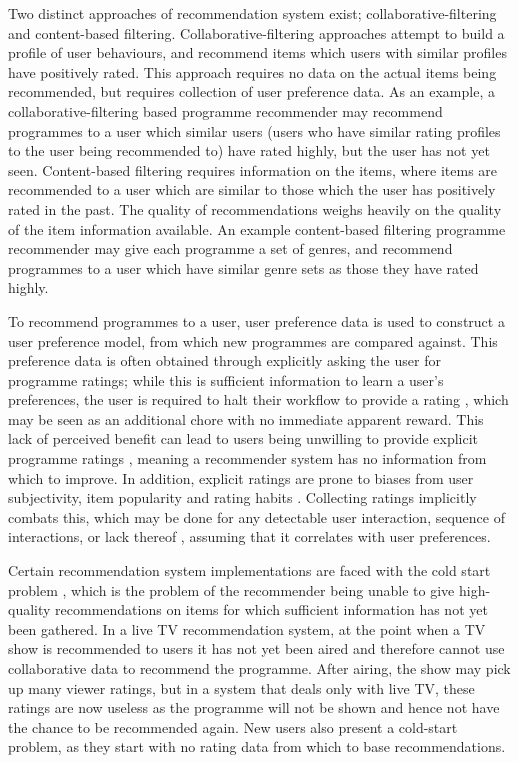 	Two distinct approaches of recommendation system exist; collaborative-filtering and content-based filtering. Collaborative-filtering approaches attempt to build a profile of user behaviours, and recommend items which users with similar profiles have positively rated. This approach requires no data on the actual items being recommended, but requires collection of user preference data. As an example, a collaborative-filtering based programme recommender may recommend programmes to a user which similar users (users who have similar rating profiles to the user being recommended to) have rated highly, but the user has not yet seen. Content-based filtering requires information on the items, where items are recommended to a user which are similar to those which the user has positively rated in the past. The quality of recommendations weighs heavily on the quality of the item information available. An example content-based filtering programme recommender may give each programme a set of genres, and recommend programmes to a user which have similar genre sets as those they have rated highly.

	To recommend programmes to a user, user preference data is used to construct a user preference model, from which new programmes are compared against. This preference data is often obtained through explicitly asking the user for programme ratings; while this is sufficient information to learn a user's preferences, the user is required to halt their workflow to provide a rating \citep{implicit_indicators}, which may be seen as an additional chore with no immediate apparent reward. This lack of perceived benefit can lead to users being unwilling to provide explicit programme ratings \citep{8_challenges}, meaning a recommender system has no information from which to improve. In addition, explicit ratings are prone to biases from user subjectivity, item popularity and rating habits \citep[p.~304]{recommender-systems-handbook}. Collecting ratings implicitly combats this, which may be done for any detectable user interaction, sequence of interactions, or lack thereof \citep{implicit_indicators}, assuming that it correlates with user preferences.

	Certain recommendation system implementations are faced with the cold start problem \cite{cold-start-problem}, which is the problem of the recommender being unable to give high-quality recommendations on items for which sufficient information has not yet been gathered. In a live TV recommendation system, at the point when a TV show is recommended to users it has not yet been aired and therefore cannot use collaborative data to recommend the programme. After airing, the show may pick up many viewer ratings, but in a system that deals only with live TV, these ratings are now useless as the programme will not be shown and hence not have the chance to be recommended again. New users also present a cold-start problem, as they start with no rating data from which to base recommendations. 

